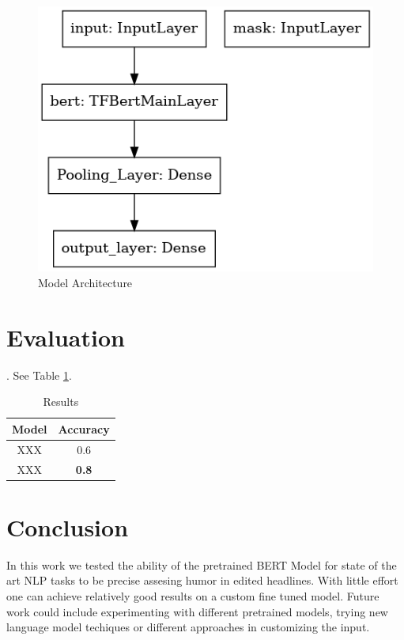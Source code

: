 \documentclass[11pt,a4paper,onecolumn,oneside,notitlepage]{article}
\begin{document}
	    \begin{figure}
		\begin{center}
			\includegraphics[width=1.0\linewidth]{model.png}
		\end{center}
		
		\caption{Model Architecture}\label{fig3}
	\end{figure}	
		
	\section{Evaluation}
     . See Table \ref{tab1}.
		
		\begin{table}
			\begin{center}
				\begin{tabular}{|c|c|}
					\hline
					\textbf{Model} &  \textbf{Accuracy}\\
					\hline
					\hline
					XXX & 0.6\\
					\hline
					XXX & \textbf{0.8}\\
					\hline
				\end{tabular}
			\end{center}
			
			\caption{Results}\label{tab1}
		\end{table}				
		

	\section{Conclusion}
	In this work we tested the ability of the pretrained BERT Model for state of the art NLP tasks to be precise assesing humor in edited headlines. With little effort one can achieve relatively good results on a custom fine tuned model. Future work could include experimenting with different pretrained models, trying new language model techiques or different approaches in customizing the input. 
	
	\printbibliography
\end{document}
